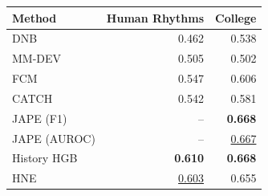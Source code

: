 \begin{tabular*}{\linewidth}{@{\extracolsep{\fill}}lrr@{}}
\toprule
Method & Human Rhythms & College \\
\midrule
DNB & 0.462 & 0.538 \\
MM-DEV & 0.505 & 0.502 \\
FCM & 0.547 & 0.606 \\
CATCH & 0.542 & 0.581 \\
JAPE (F1) & -- & \textbf{0.668} \\
JAPE (AUROC) & -- & \underline{0.667} \\
History HGB & \textbf{0.610} & \textbf{0.668} \\
\cellcolor{hnegray}HNE & \underline{0.603} & 0.655 \\
\bottomrule
\end{tabular*}